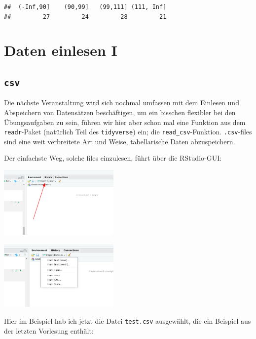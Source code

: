 \documentclass[
]{book}
\begin{document}
\begin{verbatim}
##  (-Inf,90]    (90,99]   (99,111] (111, Inf] 
##         27         24         28         21
\end{verbatim}

\hypertarget{daten-einlesen-i}{%
\section{Daten einlesen I}\label{daten-einlesen-i}}

\hypertarget{csv}{%
\subsection{\texorpdfstring{\texttt{csv}}{csv}}\label{csv}}

Die nächste Veranstaltung wird sich nochmal umfassen mit dem Einlesen und Abspeichern von Datensätzen beschäftigen, um ein bisschen flexibler bei den Übungsaufgaben zu sein, führen wir hier aber schon mal eine Funktion aus dem \texttt{readr}-Paket (natürlich Teil des \texttt{tidyverse}) ein; die \texttt{read\_csv}-Funktion. \texttt{.csv}-files sind eine weit verbreitete Art und Weise, tabellarische Daten abzuspeichern.

Der einfachste Weg, solche files einzulesen, führt über die RStudio-GUI:

\begin{center}\includegraphics[width=166.666666666667pt]{imgs/menu} \end{center}

\begin{center}\includegraphics[width=166.666666666667pt]{imgs/menu2} \end{center}

Hier im Beispiel hab ich jetzt die Datei \texttt{test.csv} ausgewählt, die ein Beispiel aus der letzten Vorlesung enthält:
\end{document}
